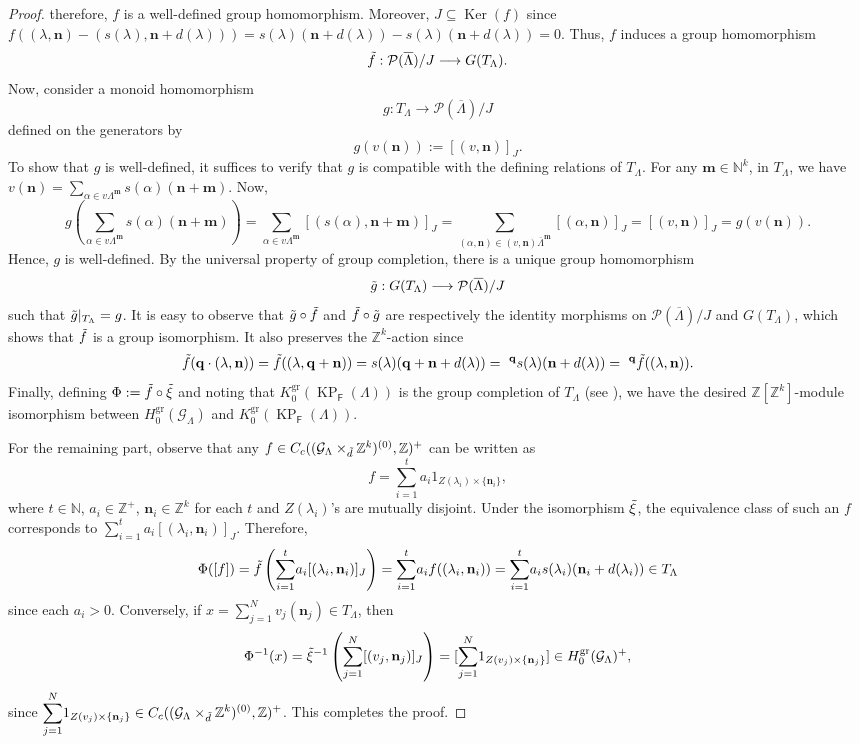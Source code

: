\documentclass[12pt]{amsart}
\newcommand{\N}{\mathbf{n}}
\newcommand{\M}{\mathbf{m}}
\newcommand{\KP}{\operatorname{KP}}
\theoremstyle{definition}
\theoremstyle{remark}
\newcommand{\Ker}{\operatorname{Ker}}
\newcommand{\gr}{\operatorname{gr}}
\begin{document}
\begin{proof}
therefore, $f$ is a well-defined group homomorphism. Moreover, $J\subseteq \Ker(f)$ since $f((\lambda,\N)-(s(\lambda),\N+d(\lambda)))=s(\lambda)(\N+d(\lambda))-s(\lambda)(\N+d(\lambda))=0$. Thus, $f$ induces a group homomorphism \[\Tilde{f}:\mathcal{P}(\overline{\Lambda})/J\longrightarrow G(T_\Lambda).\] Now, consider a monoid homomorphism \[g:T_\Lambda\longrightarrow \mathcal{P}(\overline{\Lambda})/J\] defined on the generators by \[g(v(\N)):=[(v,\N)]_J.\] To show that $g$ is well-defined, it suffices to verify that $g$ is compatible with the defining relations of $T_\Lambda$. For any $\M\in \mathbb{N}^k$, in $T_\Lambda$, we have $v(\N)=\displaystyle{\sum_{\alpha\in v\Lambda^\M}} s(\alpha)(\N+\M)$. Now, \[g\left(\displaystyle{\sum_{\alpha\in v\Lambda^\M}}s(\alpha)(\N+\M)\right)=\displaystyle{\sum_{\alpha\in v\Lambda^\M}}[(s(\alpha),\N+\M)]_J=\displaystyle{\sum_{(\alpha,\N)\in (v,\N)\overline{\Lambda}^\M}} [(\alpha,\N)]_J=[(v,\N)]_J=g(v(\N)).\] Hence, $g$ is well-defined. By the universal property of group completion, there is a unique group homomorphism \[\Tilde{g}:G(T_\Lambda)\longrightarrow \mathcal{P}(\overline{\Lambda})/J\] such that $\Tilde{g}|_{T_\Lambda}=g$. It is easy to observe that $\Tilde{g}\circ \Tilde{f}$ and $\Tilde{f}\circ \Tilde{g}$ are respectively the identity morphisms on $\mathcal{P}(\overline{\Lambda})/J$ and $G(T_\Lambda)$, which shows that $\Tilde{f}$ is a group isomorphism. It also preserves the $\mathbb{Z}^k$-action since \[\Tilde{f}(\mathbf{q}\cdot (\lambda,\N))=\Tilde{f}((\lambda,\mathbf{q}+\N))=s(\lambda)(\mathbf{q}+\N+d(\lambda))=~^\mathbf{q} s(\lambda)(\N+d(\lambda))=~^\mathbf{q} \Tilde{f}((\lambda,\N)).\] Finally, defining $\Phi:=\Tilde{f}\circ \Tilde{\xi}$ and noting that $K_0^{\gr}(\KP_\mathsf{F}(\Lambda))$ is the group completion of $T_\Lambda$ (see \cite[Remark 3.15]{HMPS}), we have the desired $\mathbb{Z}[\mathbb{Z}^k]$-module isomorphism between $H_0^{\gr}(\mathcal{G}_\Lambda)$ and $K_0^{\gr}(\KP_\mathsf{F}(\Lambda))$. 

For the remaining part, observe that any $f\in C_c((\mathcal{G}_\Lambda\times_{\Tilde{d}} \mathbb{Z}^k)^{(0)},\mathbb{Z})^+$ can be written as \[f=\displaystyle{\sum_{i=1}^{t}} a_i 1_{Z(\lambda_i)\times \{\N_i\}},\] where $t\in \mathbb{N}$, $a_i\in \mathbb{Z}^+$, $\N_i\in \mathbb{Z}^k$ for each $t$ and $Z(\lambda_i)$'s are mutually disjoint. Under the isomorphism $\Tilde{\xi}$, the equivalence class of such an $f$ corresponds to $\displaystyle{\sum_{i=1}^{t}}a_i [(\lambda_i,\N_i)]_J$. Therefore, \[\Phi([f])=\Tilde{f}\left(\displaystyle{\sum_{i=1}^{t}}a_i[(\lambda_i,\N_i)]_J\right)=\displaystyle{\sum_{i=1}^{t}}a_i f((\lambda_i,\N_i))=\displaystyle{\sum_{i=1}^{t}}a_i s(\lambda_i)(\N_i+d(\lambda_i))\in T_\Lambda\] since each $a_i >0$. Conversely, if $x=\displaystyle{\sum_{j=1}^{N}}v_j(\N_j)\in T_\Lambda$, then \[\Phi^{-1}(x)=\Tilde{\xi}^{-1}\left(\displaystyle{\sum_{j=1}^{N}}[(v_j,\N_j)]_J\right)=[\displaystyle{\sum_{j=1}^{N}} 1_{Z(v_j)\times \{\N_j\}}]\in H_0^{\gr}(\mathcal{G}_\Lambda)^+,\] since $\displaystyle{\sum_{j=1}^{N}} 1_{Z(v_j)\times \{\N_j\}}\in C_c((\mathcal{G}_\Lambda\times_{\Tilde{d}} \mathbb{Z}^k)^{(0)},\mathbb{Z})^+$. This completes the proof. 
\end{proof}
\end{document}
